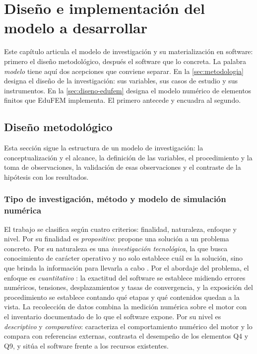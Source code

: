 \chapter{Diseño e implementación del modelo a desarrollar}
\label{cap:diseno}

Este capítulo articula el modelo de investigación y su materialización en software: primero el diseño metodológico, después el software que lo concreta. La palabra \emph{modelo} tiene aquí dos acepciones que conviene separar. En la \autoref{sec:metodologia} designa el diseño de la investigación: sus variables, sus casos de estudio y sus instrumentos. En la \autoref{sec:diseno-edufem} designa el modelo numérico de elementos finitos que EduFEM implementa. El primero antecede y encuadra al segundo.

\section{Diseño metodológico}
\label{sec:metodologia}

Esta sección sigue la estructura de un modelo de investigación: la conceptualización y el alcance, la definición de las variables, el procedimiento y la toma de observaciones, la validación de esas observaciones y el contraste de la hipótesis con los resultados.

\subsection{Tipo de investigación, método y modelo de simulación numérica}
\label{sec:proceso-met}

El trabajo se clasifica según cuatro criterios: finalidad, naturaleza, enfoque y nivel. Por su finalidad es \emph{propositivo}: propone una solución a un problema concreto. Por su naturaleza es una \emph{investigación tecnológica}, la que busca conocimiento de carácter operativo y no solo establece cuál es la solución, sino que brinda la información para llevarla a cabo \autocite[p.~91]{garciacordoba2005tecnologica}. Por el abordaje del problema, el enfoque es \emph{cuantitativo} \autocite[p.~6]{sampieri2018metodologia}: la exactitud del software se establece midiendo errores numéricos, tensiones, desplazamientos y tasas de convergencia, y la exposición del procedimiento se establece contando qué etapas y qué contenidos quedan a la vista. La recolección de datos combina la medición numérica sobre el motor con el inventario documentado de lo que el software expone. Por su nivel es \emph{descriptivo} y \emph{comparativo}: caracteriza el comportamiento numérico del motor y lo compara con referencias externas, contrasta el desempeño de los elementos Q4 y Q9, y sitúa el software frente a los recursos existentes.

